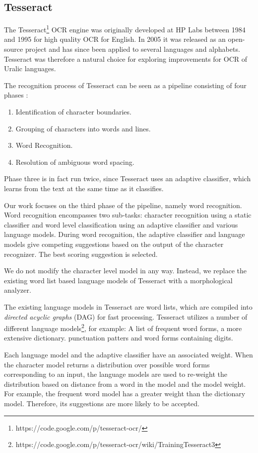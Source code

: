 \documentclass[b5paper]{article}
\begin{document}
\subsection{Tesseract}
The Tesseract\footnote{https://code.google.com/p/tesseract-ocr/} OCR
engine \cite{smith07} was originally developed at HP Labs between 1984
and 1995 for high quality OCR for English. In 2005 it was released as
an open-source project and has since been applied to several languages
and alphabets. Tesseract was therefore a natural choice for exploring
improvements for OCR of Uralic languages.

The recognition process of Tesseract can be seen as a pipeline
consisting of four phases \cite{smith07}:
\begin{enumerate}
\item Identification of character boundaries.
\item Grouping of characters into words and lines.
\item Word Recognition.
\item Resolution of ambiguous word spacing.
\end{enumerate}
Phase three is in fact run twice, since Tesseract uses an adaptive
classifier, which learns from the text at the same time as it
classifies.

Our work focuses on the third phase of the pipeline, namely word
recognition. Word recognition encompasses two sub-tasks: character
recognition using a static classifier and word level classification
using an adaptive classifier and various language models. During word
recognition, the adaptive classifier and language models give
competing suggestions based on the output of the character
recognizer. The best scoring suggestion is selected.

We do not modify the character level model in any way. Instead, we
replace the existing word list based language models of Tesseract with
a morphological analyzer.

The existing language models in Tesseract are word lists, which are
compiled into {\it directed acyclic graphs} (DAG) for fast
processing. Tesseract utilizes a number of different language
models\footnote{https://code.google.com/p/tesseract-ocr/wiki/TrainingTesseract3},
for example: A list of frequent word forms, a more extensive
dictionary. punctuation patters and word forms containing digits.

Each language model and the adaptive classifier have an associated
weight. When the character model returns a distribution over possible
word forms corresponding to an input, the language models are used to
re-weight the distribution based on distance from a word in the model
and the model weight. For example, the frequent word model has a
greater weight than the dictionary model. Therefore, its suggestions
are more likely to be accepted.
\end{document}
